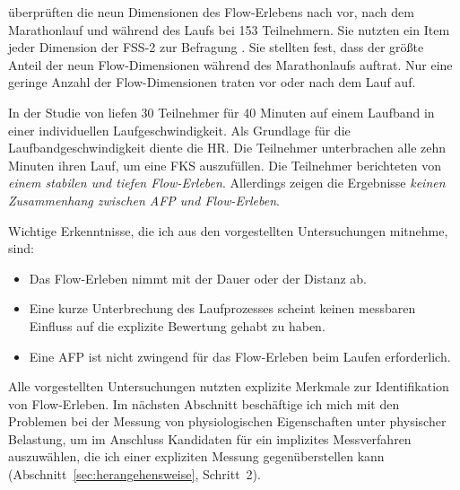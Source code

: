\citet{Jimenez-Torres2013} überprüften die neun Dimensionen des Flow-Erlebens nach \citet{Csikszentmihalyi1992} vor, nach dem Marathonlauf und während des Laufs bei 153 Teilnehmern. Sie nutzten ein Item jeder Dimension der \ac{FSS}-2 zur Befragung \citep{Jackson2002}. Sie stellten fest, dass der größte Anteil der neun Flow-Dimensionen während des Marathonlaufs auftrat. Nur eine geringe Anzahl der Flow-Dimensionen traten vor oder nach dem Lauf auf. 

In der Studie von \citet{Reinhardt2006} liefen 30 Teilnehmer für 40 Minuten auf einem Laufband in einer individuellen Laufgeschwindigkeit. Als Grundlage für die Laufbandgeschwindigkeit diente die \ac{HR}. Die Teilnehmer unterbrachen alle zehn Minuten ihren Lauf, um eine \ac{FKS} auszufüllen. Die Teilnehmer berichteten von \emph{einem stabilen und tiefen Flow-Erleben}. Allerdings zeigen die Ergebnisse \emph{keinen Zusammenhang zwischen \ac{AFP} und Flow-Erleben}.

\newpage

Wichtige Erkenntnisse, die ich aus den vorgestellten Untersuchungen mitnehme, sind: 
\begin{itemize}
	
	\item Das Flow-Erleben nimmt mit der Dauer oder der Distanz ab.
	
	\item Eine kurze Unterbrechung des Laufprozesses scheint keinen messbaren Einfluss auf die explizite Bewertung gehabt zu haben.
	
	\item Eine \ac{AFP} ist nicht zwingend für das Flow-Erleben beim Laufen erforderlich. 
\end{itemize}

Alle vorgestellten Untersuchungen nutzten explizite Merkmale zur Identifikation von Flow-Erleben. Im nächsten Abschnitt beschäftige ich mich mit den Problemen bei der Messung von physiologischen Eigenschaften unter physischer Belastung, um im Anschluss Kandidaten für ein implizites Messverfahren auszuwählen, die ich einer expliziten Messung gegenüberstellen kann (Abschnitt~\ref{sec:herangehensweise}, Schritt~2). 

